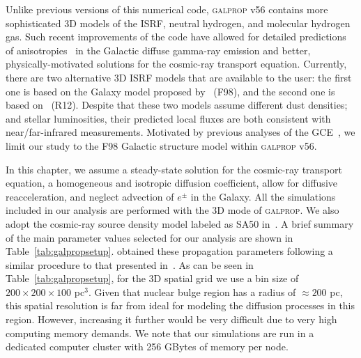 \documentclass[doublespace,nopageskip]{VTthesis}
\begin{document}
Unlike previous versions of this numerical code, \textsc{galprop } v56 contains more sophisticated 3D models of the ISRF, neutral hydrogen, and molecular hydrogen gas. Such recent improvements of the code have allowed for detailed predictions of anisotropies~\citep{2017ApJ...846...67P,2018ApJ...856...45J} in the Galactic diffuse gamma-ray emission and better, physically-motivated solutions for the cosmic-ray transport equation.
%
Currently, there are two alternative 3D ISRF models that are available to the user: the first one is based on the Galaxy model proposed by~\cite{1998ApJ...492..495F} (F98), and the second one is based on~\cite{2012A&A...545A..39R} (R12). Despite that these two models assume different dust densities; and stellar luminosities, their predicted local fluxes are both consistent with near/far-infrared measurements. Motivated by previous analyses of the GCE~\citep{2018NatAs...2..387M,2018NatAs...2..819B,2019JCAP...09..042M}, we limit our study to the F98 Galactic structure model within \textsc{galprop } v56.

In this chapter, we assume a steady-state solution for the cosmic-ray transport equation, a homogeneous and isotropic diffusion coefficient, allow for diffusive reacceleration,  and neglect advection of $e^\pm$ in the Galaxy. All the simulations included in our analysis are performed with the 3D mode of \textsc{galprop}. We also adopt the cosmic-ray source density model labeled as SA50 in~\cite{2018ApJ...856...45J}.  A brief summary of the main parameter values selected for our analysis are shown in Table~\ref{tab:galpropsetup}. \cite{2018ApJ...856...45J} obtained these propagation parameters following a similar procedure to that presented in~\cite{2017ApJ...846...67P}. As can be seen in Table~\ref{tab:galpropsetup}, for the 3D spatial grid we use a bin size of $200\times200\times100$ pc$^3$. Given that nuclear bulge region has a radius of $\approx 200$ pc, this spatial resolution is far from ideal for modeling the diffusion processes in this region. However, increasing it further would be very difficult due to very high computing memory demands. We note that our simulations are run in a dedicated computer cluster with 256 GBytes of memory per node. %
\end{document}
